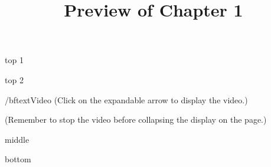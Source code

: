 \documentclass{ximera}
\title{Preview of Chapter 1}
\begin{document}
\begin{abstract}
\end{abstract}

\maketitle



top 1


top 2

\begin{explanation}
/bftext{Video} (Click on the expandable arrow to display the video.)

\begin{expandable}

\begin{center}
\end{center}

(Remember to stop the video before collapsing the display on the page.)


\end{expandable}

\end{explanation}

middle





bottom
\end{document}
